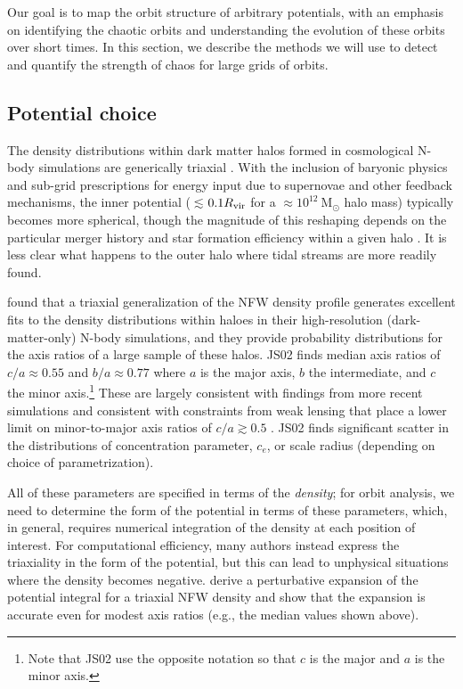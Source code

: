 \documentclass[letterpaper,12pt,preprint]{aastex}
\newcommand{\msun}{\ensuremath{\mathrm{M}_\odot}}
\begin{document}
Our goal is to map the orbit structure of arbitrary potentials, with an emphasis on identifying the chaotic orbits and understanding the evolution of these orbits over short times. In this section, we describe the methods we will use to detect and quantify the strength of chaos for large grids of orbits.

\subsection{Potential choice}\label{sec:potential}

The density distributions within dark matter halos formed in cosmological N-body simulations are generically triaxial \citep[e.g.,][]{jing02, bett07, zemp09, veraciro11}. With the inclusion of baryonic physics and sub-grid prescriptions for energy input due to supernovae and other feedback mechanisms, the inner potential ($\lesssim$$0.1R_{\rm vir}$ for a $\approx$$10^{12}~\msun$ halo mass) typically becomes more spherical, though the magnitude of this reshaping depends on the particular merger history and star formation efficiency within a given halo \citep[e.g.,][]{dubinski??, butsky15}. It is less clear what happens to the outer halo where tidal streams are more readily found. %

 \citet[][hereafter JS02]{jing02} found that a triaxial generalization of the NFW density profile \citep{navarro96} generates excellent fits to the density distributions within haloes in their high-resolution (dark-matter-only) N-body simulations, and they provide probability distributions for the axis ratios of a large sample of these halos. JS02 finds median axis ratios of $c/a \approx 0.55$ and $b/a \approx 0.77$ where $a$ is the major axis, $b$ the intermediate, and $c$ the minor axis.\footnote{Note that JS02 use the opposite notation so that $c$ is the major and $a$ is the minor axis.} These are largely consistent with findings from more recent simulations \citep[e.g.,][]{millenium, hmm, butsky15} and consistent with constraints from weak lensing that place a lower limit on minor-to-major axis ratios of $c/a\gtrsim0.5$ \citep{vanuitert12}. JS02 finds significant scatter in the distributions of concentration parameter, $c_e$, or scale radius (depending on choice of parametrization). 

All of these parameters are specified in terms of the \emph{density}; for orbit analysis, we need to determine the form of the potential in terms of these parameters, which, in general, requires numerical integration of the density at each position of interest. For computational efficiency, many authors instead express the triaxiality in the form of the potential, but this can lead to unphysical situations where the density becomes negative. \citet{leesuto03} derive a perturbative expansion of the potential integral for a triaxial NFW density and show that the expansion is accurate even for modest axis ratios (e.g., the median values shown above). 
\end{document}
